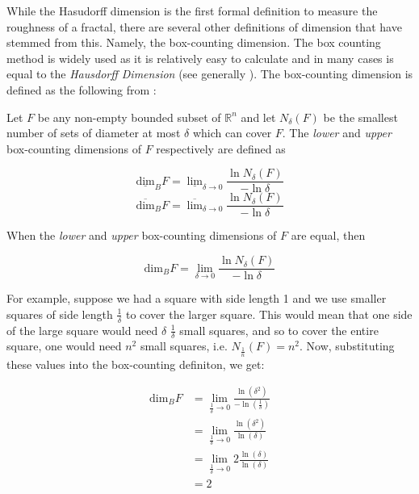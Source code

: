\documentclass[11pt]{article}
\begin{document}
While the Hasudorff dimension is the first formal definition to measure
the roughness of a fractal, there are several other definitions of dimension
that have stemmed from this. Namely, the box-counting dimension. The box
counting method is widely used as it is relatively easy to calculate \cite[p. 41]{falconerFractalGeometryMathematical2003b}
and in many cases is equal to the \emph{Hausdorff Dimension}  \cite[p. 11]{markpollicottFractalsDimensionTheory2005} (see generally \cite{ListFractalsHausdorff2020}).
The box-counting dimension is defined as the following from
\cite{falconerFractalGeometryMathematical2003}:

Let \(F\) be any non-empty bounded subset of \(\mathbb{R}^n\) and let \(N_\delta(F)\) be the smallest
number of sets of diameter at most \(\delta\) which can cover \(F\). The \emph{lower} and \emph{upper}
box-counting dimensions of \(F\) respectively are defined as

\begin{equation*}
    \underline{\text{dim}}_BF = \underline{\lim}_{\delta \to 0} \frac{\ln N_\delta(F)}{-\ln \delta}
\end{equation*}
\begin{equation*}
\overline{\text{dim}}_BF = \overline{\lim}_{\delta \to 0} \frac{\ln N_\delta(F)}{-\ln \delta}
\end{equation*}

When the \emph{lower} and \emph{upper} box-counting dimensions of \(F\) are equal, then

\begin{equation*}
\text{dim}_BF = \lim_{\delta \to 0} \frac{\ln N_\delta(F)}{-\ln \delta}
\end{equation*}

For example, suppose we had a square with side length 1 and we use smaller squares of side
length \(\frac{1}{\delta}\) to cover the larger square. This would mean that one side of the
large square would need \(\delta\) \(\frac{1}{\delta}\) small squares, and so to cover
the entire square, one would need \(n^2\) small squares, i.e. \(N_{\frac{1}{n}}(F) = n^2\). Now,
substituting these values into the box-counting definiton, we get:

\begin{align*}
\text{dim}_BF &= \lim_{\frac{1}{\delta} \to 0} \frac{\ln(\delta^2)}{-\ln(\frac{1}{\delta})}\\
&= \lim_{\frac{1}{\delta} \to 0} \frac{\ln(\delta^2)}{\ln(\delta)}\\
&= \lim_{\frac{1}{\delta} \to 0} 2\frac{\ln(\delta)}{\ln(\delta)}\\
&= 2
\end{align*}
\end{document}
